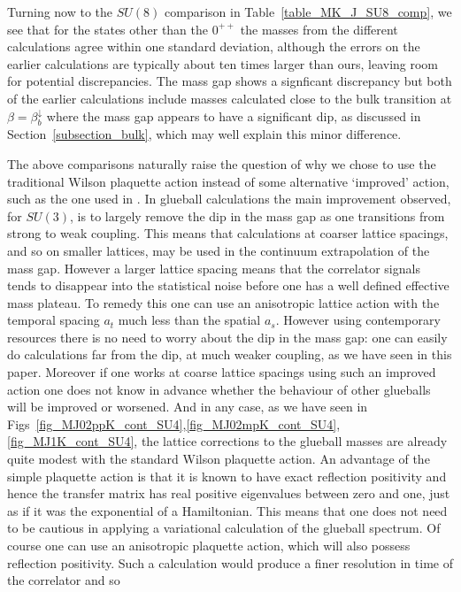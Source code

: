 \documentclass[12pt]{article}
\begin{document}
Turning now to the $SU(8)$ comparison in Table~\ref{table_MK_J_SU8_comp}, we see that
for the states other than the $0^{++}$ the masses from the different calculations agree
within one standard deviation, although the errors on the earlier calculations are typically
about ten times larger than ours, leaving room for potential discrepancies.
The mass gap shows a signficant discrepancy but both of the earlier calculations include
masses calculated close to the bulk transition at $\beta=\beta_b^\downarrow$ where
the mass gap appears to have a significant dip, as discussed in Section~\ref{subsection_bulk},
which may well explain this minor difference.

The above comparisons naturally raise the question of why we chose to use the traditional Wilson
plaquette action instead of some alternative `improved' action, such as the one used in 
%
\cite{MP-2005}.
%
In glueball calculations the main improvement observed, for $SU(3)$, is to
largely remove the dip in the mass gap as one transitions from strong to weak coupling.
This means that calculations at coarser lattice spacings, and so on smaller lattices, may be
used in the continuum extrapolation of the mass gap. However a larger lattice spacing
means that the correlator signals tends to disappear into the statistical noise before one
has a well defined effective mass plateau. To remedy this one can use an anisotropic
lattice action with the temporal spacing $a_t$ much less than the spatial $a_s$.
However using contemporary resources there is no need to worry about the dip in the mass gap:
one can easily do calculations far from the dip, at much weaker coupling, as we have seen
in this paper. Moreover if one works at coarse lattice spacings using such an improved action 
one does not know in advance whether the behaviour of other glueballs will be improved
or worsened. And in any case, as we have seen in
Figs~\ref{fig_MJ02ppK_cont_SU4},\ref{fig_MJ02mpK_cont_SU4},\ref{fig_MJ1K_cont_SU4},
the lattice corrections to the glueball masses are already quite modest with
the standard Wilson plaquette  action. An advantage of the simple plaquette action
is that it is known to have exact reflection positivity and hence the transfer matrix has
real positive eigenvalues between zero and one, just as if it was the exponential of
a Hamiltonian. This means that one does not need to be
cautious in applying a variational calculation of the glueball spectrum. Of course
one can use an anisotropic plaquette action, which will also possess reflection positivity.
Such a calculation would produce a finer resolution in time of the correlator and so
\end{document}
